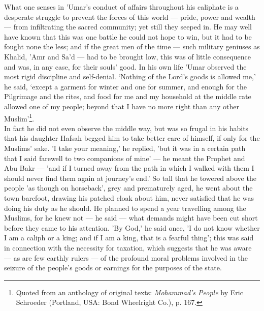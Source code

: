 \documentclass[10pt, twoside]{book}
\begin{document}
What one senses in 'Umar's conduct of affairs throughout his caliphate is a desperate struggle to prevent the forces of this world --- pride, power and wealth --- from infiltrating the sacred community; yet still they seeped in. He may well have known that this was one battle he could not hope to win, but it had to be fought none the less; and if the great men of the time --- such military geniuses as Khalid, 'Amr and Sa'd --- had to be brought low, this was of little consequence and was, in any case, for their souls' good. In his own life 'Umar observed the most rigid discipline and self\hyp{}denial. `Nothing of the Lord's goods is allowed me,' he said, `except a garment for winter and one for summer, and enough for the Pilgrimage and the rites, and food for me and my household at the middle rate allowed one of my people; beyond that I have no more right than any other Muslim'\footnote{Quoted from an anthology of original texts: \emph{Mohammad's People} by Eric Schroeder (Portland, USA: Bond Wheelright Co.), p. 167.}. \\

In fact he did not even observe the middle way, but was so frugal in his habits that his daughter Hafsah begged him to take better care of himself, if only for the Muslims' sake. 'I take your meaning,' he replied, 'but it was in a certain path that I said farewell to two companions of mine' --- he meant the Prophet and Abu Bakr --- 'and if I turned away from the path in which I walked with them I should never find them again at journey's end.' So tall that he towered above the people 'as though on horseback', grey and prematurely aged, he went about the town barefoot, drawing his patched cloak about him, never satisfied that he was doing his duty as he should. He planned to spend a year travelling among the Muslims, for he knew not --- he said --- what demands might have been cut short before they came to his attention. 'By God,' he said once, 'I do not know whether I am a caliph or a king; and if I am a king, that is a fearful thing'; this was said in connection with the necessity for taxation, which suggests that he was aware --- as are few earthly rulers --- of the profound moral problems involved in the seizure of the people's goods or earnings for the purposes of the state. \\
\end{document}
